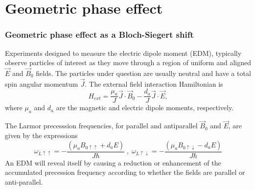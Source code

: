 \chapter{Geometric phase effect\label{app:GPE}}

\subsection{Geometric phase effect as a Bloch-Siegert shift}

Experiments designed to measure the electric dipole moment (EDM),
typically observe particles of interest as they move through a region
of uniform and aligned $\vec{E}$ and $\vec{B}_0$ fields.  The
particles under question are usually neutral and have a total spin
angular momentum $\vec{J}$.  The external field interaction
Hamiltonian is
%
\begin{equation}
H_{ext} = \frac{\mu_a}{J}\vec{J}\cdot\vec{B}_0 - \frac{d_a}{J}\vec{J}\cdot\vec{E},
\end{equation}
%
where $\mu_a$ and $d_a$ are the magnetic and electric dipole moments,
respectively.

The Larmor precesssion frequencies, for parallel and antiparallel
$\vec{B}_0$ and $\vec{E}$, are given by the expressions
%
\begin{equation}
\label{eqn:GPEw}
\omega_{L\uparrow\uparrow} = -\frac{(\mu_a B_{0\uparrow\uparrow} + d_a E)}{J\hbar} \; , \; \omega_{L\uparrow\downarrow} = -\frac{(\mu_a B_{0\uparrow\downarrow} - d_a E)}{J\hbar} 
\end{equation}
%
An EDM will reveal itself by causing a reduction or enhancement of the
accumulated precession frequency according to whether the fields are
parallel or anti-parallel.

